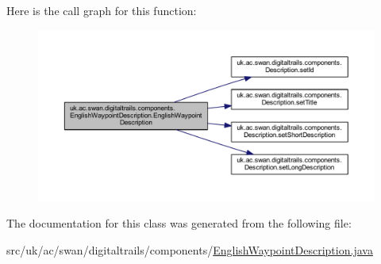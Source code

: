 Here is the call graph for this function\+:\nopagebreak
\begin{figure}[H]
\begin{center}
\leavevmode
\includegraphics[width=350pt]{classuk_1_1ac_1_1swan_1_1digitaltrails_1_1components_1_1_english_waypoint_description_aca73e7b961e066f23d130939564d5be5_cgraph}
\end{center}
\end{figure}




The documentation for this class was generated from the following file\+:\begin{DoxyCompactItemize}
\item 
src/uk/ac/swan/digitaltrails/components/\hyperlink{_english_waypoint_description_8java}{English\+Waypoint\+Description.\+java}\end{DoxyCompactItemize}
